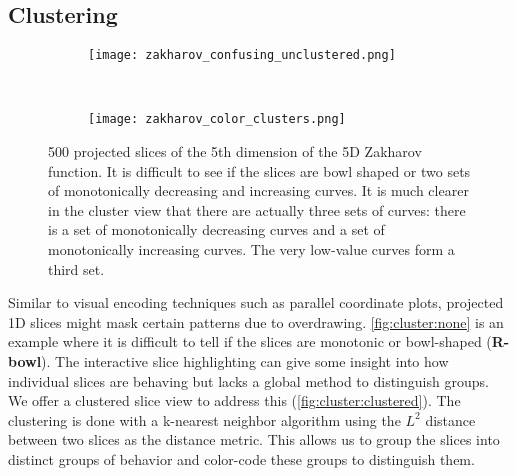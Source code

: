 \subsection{Clustering}

\begin{figure}
  \centering
  \begin{subfigure}[b]{0.48\columnwidth}
    \texttt{[image: zakharov\_confusing\_unclustered.png]}
    \caption{
    }
    \label{fig:cluster:none}
  \end{subfigure}
  ~
  \begin{subfigure}[b]{0.48\columnwidth}
    \texttt{[image: zakharov\_color\_clusters.png]}
    \caption{
    }
    \label{fig:cluster:clustered}
  \end{subfigure}
  \caption{
    500 projected slices of the 5th dimension of the 5D Zakharov~\cite{Back:1996} 
    function. It is difficult to see if the slices are bowl shaped or two sets
    of monotonically decreasing and increasing curves. It is much clearer in 
    the cluster view that there are actually three sets of curves: 
    there is a set of monotonically decreasing curves and a set of 
    monotonically increasing curves. The very low-value curves form a third
    set.
  }
\end{figure}

Similar to visual encoding techniques such as parallel coordinate plots, projected 1D slices might mask certain patterns due to
overdrawing.
\autoref{fig:cluster:none} is an example where it is difficult to tell if the
slices are monotonic or bowl-shaped (\textbf{R-bowl}). The interactive slice highlighting
can give some insight into how individual slices are behaving but lacks
a global method to distinguish groups. We offer a
clustered slice view to address this (\autoref{fig:cluster:clustered}). 
The clustering is done with a k-nearest neighbor algorithm using the
$L^2$ distance between two slices as the distance metric.
This allows us to group the slices into distinct
groups of behavior and color-code these groups to distinguish them.


